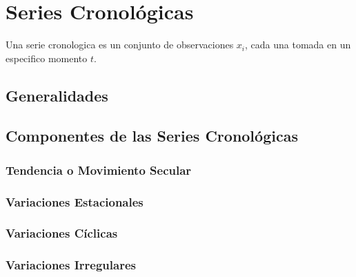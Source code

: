 \chapter{Series Cronológicas}
Una serie cronologica es un conjunto de observaciones $x_i$, cada una tomada en un especifico momento $t$.
\section{Generalidades}
\section{Componentes de las Series Cronológicas}
\subsection{Tendencia o Movimiento Secular}
\subsection{Variaciones Estacionales}
\subsection{Variaciones Cíclicas}
\subsection{Variaciones Irregulares}